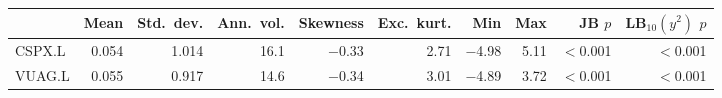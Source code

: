 \begin{tabular}{lrrrrrrrrr}
\toprule
 & Mean & Std.\ dev. & Ann.\ vol. & Skewness & Exc.\ kurt. & Min & Max & JB $p$ & LB$_{10}(y^2)$ $p$ \\
\midrule
CSPX.L & 0.054 & 1.014 & 16.1 & $-$0.33 & 2.71 & $-$4.98 & 5.11 & $<$0.001 & $<$0.001 \\
VUAG.L & 0.055 & 0.917 & 14.6 & $-$0.34 & 3.01 & $-$4.89 & 3.72 & $<$0.001 & $<$0.001 \\
\bottomrule
\end{tabular}